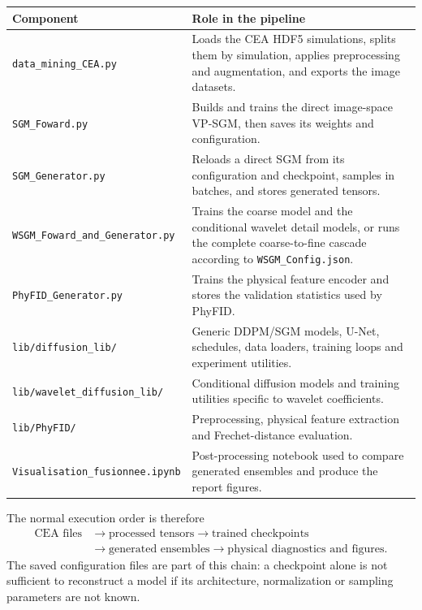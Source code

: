 {\footnotesize
\begin{longtable}{@{}p{}p{}@{}}
\toprule
\textbf{Component} & \textbf{Role in the pipeline} \\
\midrule
\endhead
\lstinline|data_mining_CEA.py| & Loads the CEA HDF5 simulations, splits them by simulation, applies preprocessing and augmentation, and exports the image datasets. \\
\lstinline|SGM_Foward.py| & Builds and trains the direct image-space VP-SGM, then saves its weights and configuration. \\
\lstinline|SGM_Generator.py| & Reloads a direct SGM from its configuration and checkpoint, samples in batches, and stores generated tensors. \\
\lstinline|WSGM_Foward_and_Generator.py| & Trains the coarse model and the conditional wavelet detail models, or runs the complete coarse-to-fine cascade according to \lstinline|WSGM_Config.json|. \\
\lstinline|PhyFID_Generator.py| & Trains the physical feature encoder and stores the validation statistics used by PhyFID. \\
\lstinline|lib/diffusion_lib/| & Generic DDPM/SGM models, U-Net, schedules, data loaders, training loops and experiment utilities. \\
\lstinline|lib/wavelet_diffusion_lib/| & Conditional diffusion models and training utilities specific to wavelet coefficients. \\
\lstinline|lib/PhyFID/| & Preprocessing, physical feature extraction and Frechet-distance evaluation. \\
\lstinline|Visualisation_fusionnee.ipynb| & Post-processing notebook used to compare generated ensembles and produce the report figures. \\
\bottomrule
\end{longtable}
}

The normal execution order is therefore
\[
\begin{aligned}
\text{CEA files} &\longrightarrow \text{processed tensors}
\longrightarrow \text{trained checkpoints} \\
&\longrightarrow \text{generated ensembles}
\longrightarrow \text{physical diagnostics and figures}.
\end{aligned}
\]
The saved configuration files are part of this chain: a checkpoint alone is
not sufficient to reconstruct a model if its architecture, normalization or
sampling parameters are not known.

